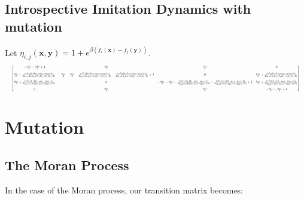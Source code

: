 \documentclass{article}
\begin{document}
\subsection*{Introspective Imitation Dynamics with mutation}
Let \(\eta_{i,j}(\mathbf{x}, \mathbf{y}) = 1 + e^{\beta(f_i(\mathbf{x}) - f_j(\mathbf{y}))}\).
\begin{equation}
\resizebox{\textwidth}{!}{$
\begin{bmatrix}
-\frac{\mu_{12}}{2} - \frac{\mu_{22}}{2} + 1 &
\frac{\mu_{22}}{2} & \frac{\mu_{12}}{2} & 0\\[1em]
\frac{\mu_{21}}{2}
+ \frac{(\epsilon f_{1}(b) + 1)(-\mu_{21} - \mu_{22} + 1)}
       {2\eta_{2,2}(\mathbf{b},\mathbf{a})(\epsilon f_{1}(b) + \epsilon f_{2}(b) + 2)}
&
-\frac{\mu_{12}}{2} - \frac{\mu_{21}}{2}
- \frac{(\epsilon f_{1}(b) + 1)(-\mu_{21} - \mu_{22} + 1)}
       {2\eta_{2,2}(\mathbf{b},\mathbf{a})(\epsilon f_{1}(b) + \epsilon f_{2}(b) + 2)}
- \frac{(\epsilon f_{2}(b) + 1)(-\mu_{11} - \mu_{12} + 1)}
       {2\eta_{1,1}(\mathbf{b},\mathbf{d})(\epsilon f_{1}(b) + \epsilon f_{2}(b) + 2)}
+ 1 & 0 &
\frac{\mu_{12}}{2}
+ \frac{(\epsilon f_{2}(b) + 1)(-\mu_{11} - \mu_{12} + 1)}
       {2\eta_{1,1}(\mathbf{b},\mathbf{d})(\epsilon f_{1}(b) + \epsilon f_{2}(b) + 2)}\\[1em]
\frac{\mu_{11}}{2}
+ \frac{(\epsilon f_{2}(c) + 1)(-\mu_{11} - \mu_{12} + 1)}
       {2\eta_{1,1}(\mathbf{c},\mathbf{a})(\epsilon f_{1}(c) + \epsilon f_{2}(c) + 2)}
& 0 &
-\frac{\mu_{11}}{2} - \frac{\mu_{22}}{2}
- \frac{(\epsilon f_{1}(c) + 1)(-\mu_{21} - \mu_{22} + 1)}
       {2\eta_{2,2}(\mathbf{c},\mathbf{d})(\epsilon f_{1}(c) + \epsilon f_{2}(c) + 2)}
- \frac{(\epsilon f_{2}(c) + 1)(-\mu_{11} - \mu_{12} + 1)}
       {2\eta_{1,1}(\mathbf{c},\mathbf{a})(\epsilon f_{1}(c) + \epsilon f_{2}(c) + 2)}
+ 1 &
\frac{\mu_{22}}{2}
+ \frac{(\epsilon f_{1}(c) + 1)(-\mu_{21} - \mu_{22} + 1)}
       {2\eta_{2,2}(\mathbf{c},\mathbf{d})(\epsilon f_{1}(c) + \epsilon f_{2}(c) + 2)}\\[1em]
0 & \frac{\mu_{11}}{2} & \frac{\mu_{21}}{2} &
-\frac{\mu_{11}}{2} - \frac{\mu_{21}}{2} + 1
\end{bmatrix}$}
\label{eqn:2x2_IID_Mutation_Transition}
\end{equation}

\section{Mutation}


\subsection{The Moran Process}
In the case of the Moran process, our transition matrix becomes:
\end{document}
